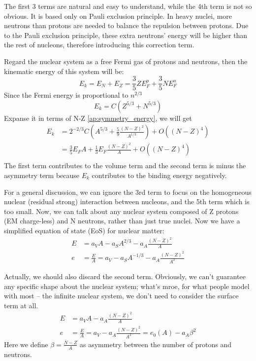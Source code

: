 The first 3 terms are natural and easy to understand, while the 4th term is 
not so obvious. It is based only on Pauli exclusion principle. In heavy nuclei,
more neutrons than protons are needed to balance the repulsion between protons.
Due to the Pauli exclusion principle, these extra neutrons' energy will be 
higher than the rest of nucleons, therefore introducing this correction term.

Regard the nuclear system as a free Fermi gas of protons and neutrons, then the 
kinematic energy of this system will be:
$$ E_k = E_N + E_Z = \frac{3}{5}ZE_F^p + \frac{3}{5}NE_F^n $$
Since the Fermi energy is proportional to $n^{2/3}$
$$ E_k = C(Z^{5/3} + N^{5/3})  $$
Expanse it in terms of N-Z \ref{ap:symmetry_energy}, we will get
\begin{equation*}
    \begin{aligned}
	E_k &= 2^{-2/3}C\left(A^{5/3} + \frac{5}{9}\frac{(N-Z)^2}{A^{1/3}} \right) + O((N-Z)^4) \\
	    &= \frac{3}{5} E_F A + \frac{1}{3}E_F\frac{(N-Z)^2}{A} + O((N-Z)^4) \\
    \end{aligned}
\end{equation*}
The first term contributes to the volume term and the second term is minus the 
asymmetry term because $E_k$ contributes to the binding energy negatively.

For a general discussion, we can ignore the 3rd term to focus on the homogeneous
nuclear (residual strong) interaction between nucleons, and the 5th term which is too small.
Now, we can talk about any nuclear system composed of Z protons (EM charge-less) 
and N neutrons, rather than just true nuclei. Now we have a simplified equation
of state (EoS) for nuclear matter:
\begin{equation}
    \label{eq:modified-mass-formula-1}
    \begin{aligned}
	E &= a_V A - a_S A^{2/3} - a_A\frac{(N-Z)^2}{A}  \\
	e &= \frac{E}{A} = a_V - a_S A^{-1/3} - a_A\frac{(N-Z)^2}{A^2}
    \end{aligned}
\end{equation}

Actually, we should also discard the second term. Obviously, we can't guarantee
any specific shape about the nuclear system; what's mroe, for what people model
with most -- the infinite nuclear system, we don't need to consider the surface 
term at all.
\begin{equation}
    \label{eq:modified-mass-formula-2}
    \begin{aligned}
	E &= a_V A - a_A\frac{(N-Z)^2}{A}  \\
	e &= \frac{E}{A} = a_V - a_A\frac{(N-Z)^2}{A^2} = e_0(A) - a_A\beta^2 
    \end{aligned}
\end{equation}
Here we define $\beta = \frac{N-Z}{A}$ as asymmetry between the number of protons and neutrons. 

